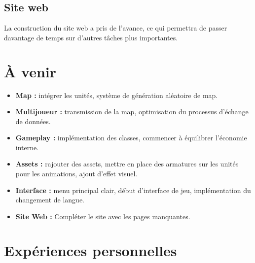 \documentclass[12pt]{report}
\begin{document}
\section*{Site web}

La construction du site web a pris de l'avance, ce qui permettra de passer davantage de temps sur d'autres tâches plus importantes.

\chapter{À venir}

\begin{itemize}
	\item \textbf{Map :} intégrer les unités, système de génération aléatoire de map.
	\item \textbf{Multijoueur :} transmission de la map, optimisation du processus d'échange de données.
	\item \textbf{Gameplay :} implémentation des classes, commencer à équilibrer l’économie interne.
	\item \textbf{Assets :} rajouter des assets, mettre en place des armatures sur les unités pour les animations, ajout d'effet visuel.
	\item \textbf{Interface :} menu principal clair, début d'interface de jeu, implémentation du changement de langue.
	\item \textbf{Site Web :} Compléter le site avec les pages manquantes.
\end{itemize}

\chapter{Expériences personnelles}
\end{document}
